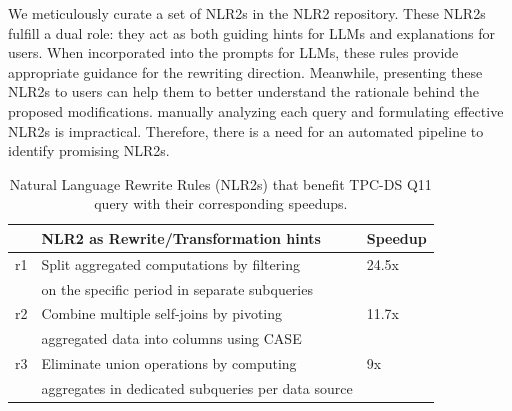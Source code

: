  We meticulously curate a set of NLR2s in the NLR2 repository. These NLR2s fulfill a dual role: they act as both guiding hints for LLMs and explanations for users. When incorporated into the prompts for LLMs, these rules provide appropriate guidance for the rewriting direction. Meanwhile, presenting these NLR2s to users can help them to better understand the rationale behind the proposed modifications.   
manually analyzing each query and formulating effective NLR2s is impractical. Therefore, there is a need for an automated pipeline to identify promising NLR2s.



\begin{table}[tbp]
\inv
    \centering
    \small
    \renewcommand{\arraystretch}{1.2} %
    \setlength{\tabcolsep}{6pt} %
    \begin{tabular}{|l|l|l|}
        \hline
         & \textbf{NLR2} \textbf{as Rewrite/Transformation hints} & \textbf{Speedup} \\
        \hline
        r1 & Split aggregated computations by filtering  & 24.5x \\
           & on the specific period in separate subqueries & \\
        \hline
        r2 & Combine multiple self-joins by pivoting  & 11.7x \\
           & aggregated data into columns using CASE & \\
        \hline
        r3 & Eliminate union operations by computing  & 9x \\
           & aggregates in dedicated subqueries per data source & \\
        \hline
    \end{tabular}
    \captionsetup{font=small,name=Table}
    \caption{Natural Language Rewrite Rules (NLR2s) that benefit TPC-DS Q11 query with their corresponding speedups.}
    \inv
    \label{gen:tab:nlr2-speedups}
\end{table}











